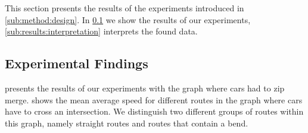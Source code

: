 This section presents the results of the experiments introduced in \cref{sub:method:design}. In \cref{sub:results:experimental} we show the results of our experiments, \cref{sub:results:interpretation} interprets the found data.

\subsection{Experimental Findings}
\label{sub:results:experimental}
 presents the results of our experiments with the graph where cars had to zip merge.  shows the mean average speed for different routes in the graph where cars have to cross an intersection. We distinguish two different groups of routes within this graph, namely straight routes and routes that contain a bend. 

